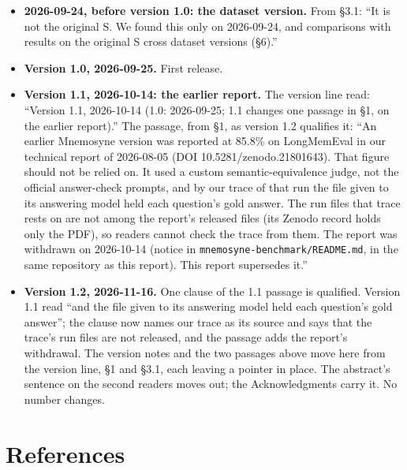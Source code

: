 \documentclass[11pt]{article}
\begin{document}
\begin{itemize}
\item
  \textbf{2026-09-24, before version 1.0: the dataset version.} From §3.1: ``It is not the original S. We
  found this only on 2026-09-24, and comparisons with results on the original S cross dataset versions (§6).''
\item
  \textbf{Version 1.0, 2026-09-25.} First release.
\item
  \textbf{Version 1.1, 2026-10-14: the earlier report.} The version line read: ``Version 1.1, 2026-10-14 (1.0:
  2026-09-25; 1.1 changes one passage in §1, on the earlier report).'' The passage, from §1, as version 1.2
  qualifies it: ``An earlier Mnemosyne version was reported at 85.8\% on LongMemEval in our technical report
  of 2026-08-05 (DOI 10.5281/zenodo.21801643). That figure should not be relied on. It used a custom
  semantic-equivalence judge, not the official answer-check prompts, and by our trace of that run
  the file given to its answering model held each question's gold answer. The run files that trace rests on
  are not among the report's released files (its Zenodo record holds only the PDF), so readers cannot
  check the trace from them. The report was withdrawn on 2026-10-14 (notice in
  \texttt{mnemosyne-benchmark/README.md}, in the same repository as this report). This report supersedes it.''
\item
  \textbf{Version 1.2, 2026-11-16.} One clause of the 1.1 passage is qualified. Version 1.1 read ``and the file
  given to its answering model held each question's gold answer''; the clause now names our trace
  as its source and says that the trace's run files are not released, and the passage adds the
  report's withdrawal. The version notes and the two passages above move here from the version line, §1 and
  §3.1, each leaving a pointer in place. The abstract's sentence on the second readers moves out; the
  Acknowledgments carry it. No number changes.
\end{itemize}

\hypertarget{references}{%
\section{References}\label{references}}
\end{document}
